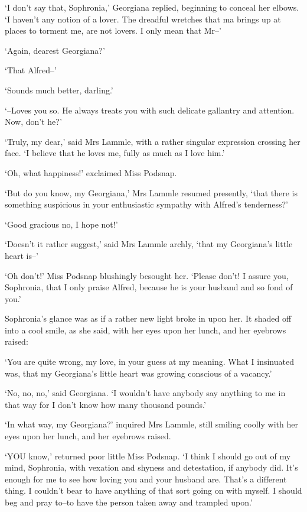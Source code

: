 ‘I don’t say that, Sophronia,’ Georgiana replied, beginning to conceal
her elbows. ‘I haven’t any notion of a lover. The dreadful wretches that
ma brings up at places to torment me, are not lovers. I only mean that
Mr--’

‘Again, dearest Georgiana?’

‘That Alfred--’

‘Sounds much better, darling.’

‘--Loves you so. He always treats you with such delicate gallantry and
attention. Now, don’t he?’

‘Truly, my dear,’ said Mrs Lammle, with a rather singular expression
crossing her face. ‘I believe that he loves me, fully as much as I love
him.’

‘Oh, what happiness!’ exclaimed Miss Podsnap.

‘But do you know, my Georgiana,’ Mrs Lammle resumed presently, ‘that
there is something suspicious in your enthusiastic sympathy with
Alfred’s tenderness?’

‘Good gracious no, I hope not!’

‘Doesn’t it rather suggest,’ said Mrs Lammle archly, ‘that my
Georgiana’s little heart is--’

‘Oh don’t!’ Miss Podsnap blushingly besought her. ‘Please don’t! I
assure you, Sophronia, that I only praise Alfred, because he is your
husband and so fond of you.’

Sophronia’s glance was as if a rather new light broke in upon her. It
shaded off into a cool smile, as she said, with her eyes upon her lunch,
and her eyebrows raised:

‘You are quite wrong, my love, in your guess at my meaning. What I
insinuated was, that my Georgiana’s little heart was growing conscious
of a vacancy.’

‘No, no, no,’ said Georgiana. ‘I wouldn’t have anybody say anything to
me in that way for I don’t know how many thousand pounds.’

‘In what way, my Georgiana?’ inquired Mrs Lammle, still smiling coolly
with her eyes upon her lunch, and her eyebrows raised.

‘YOU know,’ returned poor little Miss Podsnap. ‘I think I should go out
of my mind, Sophronia, with vexation and shyness and detestation, if
anybody did. It’s enough for me to see how loving you and your husband
are. That’s a different thing. I couldn’t bear to have anything of that
sort going on with myself. I should beg and pray to--to have the person
taken away and trampled upon.’

